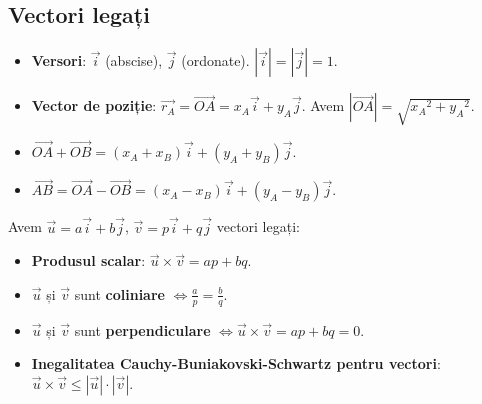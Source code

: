 \documentclass{article}
\begin{document}
\subsection*{Vectori legați}
\begin{itemize}
    \item \textbf{Versori}: $\overrightarrow{i}$ (abscise), $\overrightarrow{j}$ (ordonate). $|\overrightarrow{i}|=|\overrightarrow{j}|=1$.
    \item \textbf{Vector de poziție}: $\overrightarrow{r_A} = \overrightarrow{OA} = x_A \overrightarrow{i} + y_A \overrightarrow{j}$. Avem $|\overrightarrow{OA}|=\sqrt{{x_A}^2+{y_A}^2}$.
    \item $\overrightarrow{OA} + \overrightarrow{OB} = (x_A+x_B)\overrightarrow{i} + (y_A+y_B)\overrightarrow{j}$.
    \item $\overrightarrow{AB} = \overrightarrow{OA} - \overrightarrow{OB} = (x_A-x_B)\overrightarrow{i} + (y_A-y_B)\overrightarrow{j}$.
\end{itemize}
Avem $\overrightarrow{u}=a\overrightarrow{i}+b\overrightarrow{j}$, $\overrightarrow{v}=p\overrightarrow{i}+q\overrightarrow{j}$ vectori legați:
\begin{itemize}
    \item \textbf{Produsul scalar}: $\overrightarrow{u}\times\overrightarrow{v} = ap + bq$.
    \item $\overrightarrow{u}$ și $\overrightarrow{v}$ sunt \textbf{coliniare} $\iff \frac{a}{p} = \frac{b}{q}$.
    \item $\overrightarrow{u}$ și $\overrightarrow{v}$ sunt \textbf{perpendiculare} $\iff \overrightarrow{u}\times\overrightarrow{v} = ap + bq = 0$.
    \item \textbf{Inegalitatea Cauchy-Buniakovski-Schwartz pentru vectori}: $\overrightarrow{u}\times\overrightarrow{v} \leq |\overrightarrow{u}|\cdot|\overrightarrow{v}|$.
\end{itemize}
\end{document}
